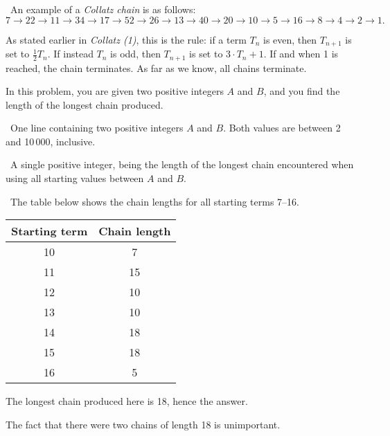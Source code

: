 

\Question\ An example of a \emph{Collatz chain} is as follows: \[
  7 \to 22 \to 11 \to 34 \to 17 \to 52 \to 26 \to 13 \to 40 \to 20 \to 10 \to 5 \to 16 \to
  8 \to 4 \to 2 \to 1.
\]

As stated earlier in \emph{Collatz (1)}, this is the rule: if a term $T_n$ is even, then
$T_{n+1}$ is set to $\frac12 T_n$. If instead $T_n$ is odd, then $T_{n+1}$ is set to
$3\cdot T_n + 1$. If and when 1 is reached, the chain terminates. As far as we know, all
chains terminate.

In this problem, you are given two positive integers $A$ and $B$, and you find the length
of the longest chain produced.

\Input\ One line containing two positive integers $A$ and $B$. Both values are between 2
and 10\,000, inclusive.

\Output\ A single positive integer, being the length of the longest chain encountered when
using all starting values between $A$ and $B$.

\Sample


\Explanation\ The table below shows the chain lengths for all starting terms 7--16.

\begin{inlinetable}
  \begin{tabular}{S[table-format=2.0]S[table-format=2.0]}
    \toprule
    {Starting term} & {Chain length} \\
                  & 7              \\
    11              & 15             \\
    12              & 10             \\
    13              & 10             \\
    14              & 18             \\
    15              & 18             \\
    16              & 5              \\
    \bottomrule
  \end{tabular}
\end{inlinetable}

The longest chain produced here is 18, hence the answer.

The fact that there were two chains of length 18 is unimportant.
